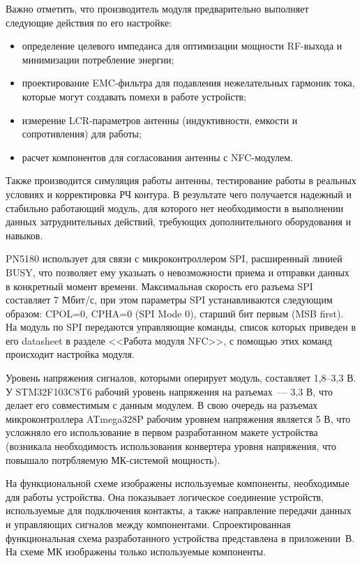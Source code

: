 Важно отметить, что производитель модуля предварительно выполняет следующие действия по его настройке:
\begin{itemize}
    \item определение целевого импеданса для оптимизации мощности RF-выхода и минимизации потребление энергии;
    \item проектирование EMC-фильтра для подавления нежелательных гармоник тока, которые могут создавать помехи в работе устройств;
    \item измерение LCR-параметров антенны (индуктивности, емкости и сопротивления) для работы;
    \item расчет компонентов для согласования антенны с NFC-модулем.
\end{itemize}

Также производится симуляция работы антенны, тестирование работы в реальных условиях и корректировка РЧ контура.
В результате чего получается надежный и стабильно работающий модуль, для которого нет необходимости в выполнении данных затруднительных действий, требующих дополнительного оборудования и навыков.


PN5180 использует для связи с микроконтроллером SPI, расширенный линией BUSY, что позволяет ему указыать о невозможности приема и отправки данных в конкретный момент времени.
Максимальная скорость его разъема SPI составляет 7 Мбит/с, при этом параметры SPI устанавливаются следующим образом: CPOL=0, CPHA=0 (SPI Mode 0), старший бит первым (MSB first).
На модуль по SPI передаются управляющие команды, список которых приведен в его datasheet в разделе <<Работа модуля NFC>>, с помощью этих команд происходит настройка модуля\cite{pn5180_datasheet}.

Уровень напряжения сигналов, которыми оперирует модуль, составляет 1,8--3,3 В.
У STM32F103C8T6 рабочий уровень напряжения на разъемах~--- 3,3 В, что делает его совместимым с данным модулем.
В свою очередь на разъемах микроконтроллера ATmega328P рабочим уровнем напряжения является 5 В, что усложняло его использование в первом разработанном макете устройства (возникала необходимость использования конвертера уровня напряжения, что повышало потрбляемую МК-системой мощность).


На функциональной схеме изображены используемые компоненты, необходимые для работы устройства.
Она показывает логическое соединение устройств, используемые для подключения контакты, а также направление передачи данных и управляющих сигналов между компонентами.
Спроектированная функциональная схема разработанного устройства представлена в приложении~В.
На схеме МК изображены только используемые компоненты.




